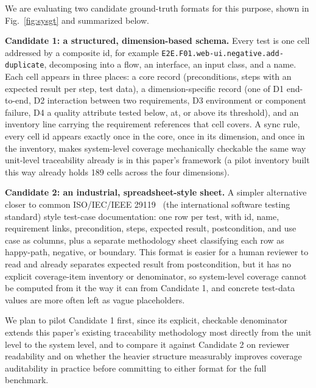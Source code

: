 \documentclass[conference]{IEEEtran}
\begin{document}
We are evaluating two candidate ground-truth formats for this purpose, shown
in Fig.~\ref{fig:sysgt} and summarized below.

\textbf{Candidate 1: a structured, dimension-based schema.} Every test is one
cell addressed by a composite id, for example
\texttt{E2E.F01.web-ui.negative.add-duplicate}, decomposing into a flow, an
interface, an input class, and a name. Each cell appears in three places: a
core record (preconditions, steps with an expected result per step, test
data), a dimension-specific record (one of D1 end-to-end, D2 interaction
between two requirements, D3 environment or component failure, D4 a quality
attribute tested below, at, or above its threshold), and an inventory line
carrying the requirement references that cell covers. A sync rule, every
cell id appears exactly once in the core, once in its dimension, and once in
the inventory, makes system-level coverage mechanically checkable the same
way unit-level traceability already is in this paper's framework (a pilot
inventory built this way already holds 189 cells across the four dimensions).

\textbf{Candidate 2: an industrial, spreadsheet-style sheet.} A simpler
alternative closer to common ISO/IEC/IEEE 29119~\cite{iso29119} (the international software
testing standard) style test-case documentation: one row per test, with id,
name, requirement links, precondition, steps, expected result, postcondition,
and use case as columns, plus a separate methodology sheet classifying each
row as happy-path, negative, or boundary. This format is easier for a human
reviewer to read and already separates expected result from postcondition,
but it has no explicit coverage-item inventory or denominator, so
system-level coverage cannot be computed from it the way it can from
Candidate 1, and concrete test-data values are more often left as vague
placeholders.

We plan to pilot Candidate 1 first, since its explicit, checkable
denominator extends this paper's existing traceability methodology most
directly from the unit level to the system level, and to compare it against
Candidate 2 on reviewer readability and on whether the heavier structure
measurably improves coverage auditability in practice before committing to
either format for the full benchmark.
\end{document}
